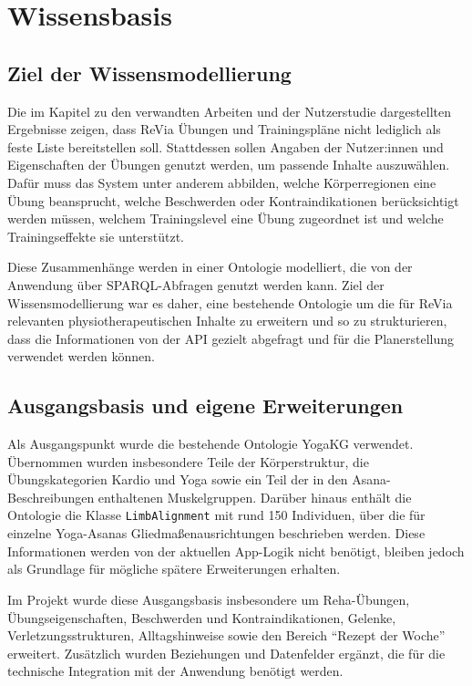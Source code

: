 \section{Wissensbasis}

\subsection{Ziel der Wissensmodellierung}

Die im Kapitel zu den verwandten Arbeiten und der Nutzerstudie dargestellten Ergebnisse zeigen, dass ReVia Übungen und Trainingspläne nicht lediglich als feste Liste bereitstellen soll. Stattdessen sollen Angaben der Nutzer:innen und Eigenschaften der Übungen genutzt werden, um passende Inhalte auszuwählen. Dafür muss das System unter anderem abbilden, welche Körperregionen eine Übung beansprucht, welche Beschwerden oder Kontraindikationen berücksichtigt werden müssen, welchem Trainingslevel eine Übung zugeordnet ist und welche Trainingseffekte sie unterstützt.

Diese Zusammenhänge werden in einer Ontologie modelliert, die von der Anwendung über SPARQL-Abfragen genutzt werden kann. Ziel der Wissensmodellierung war es daher, eine bestehende Ontologie um die für ReVia relevanten physiotherapeutischen Inhalte zu erweitern und so zu strukturieren, dass die Informationen von der API gezielt abgefragt und für die Planerstellung verwendet werden können.

\subsection{Ausgangsbasis und eigene Erweiterungen}

Als Ausgangspunkt wurde die bestehende Ontologie YogaKG verwendet. Übernommen wurden insbesondere Teile der Körperstruktur, die Übungskategorien Kardio und Yoga sowie ein Teil der in den Asana-Beschreibungen enthaltenen Muskelgruppen. Darüber hinaus enthält die Ontologie die Klasse \texttt{LimbAlignment} mit rund 150 Individuen, über die für einzelne Yoga-Asanas Gliedmaßenausrichtungen beschrieben werden. Diese Informationen werden von der aktuellen App-Logik nicht benötigt, bleiben jedoch als Grundlage für mögliche spätere Erweiterungen erhalten.

Im Projekt wurde diese Ausgangsbasis insbesondere um Reha-Übungen, Übungseigenschaften, Beschwerden und Kontraindikationen, Gelenke, Verletzungsstrukturen, Alltagshinweise sowie den Bereich ``Rezept der Woche'' erweitert. Zusätzlich wurden Beziehungen und Datenfelder ergänzt, die für die technische Integration mit der Anwendung benötigt werden.

